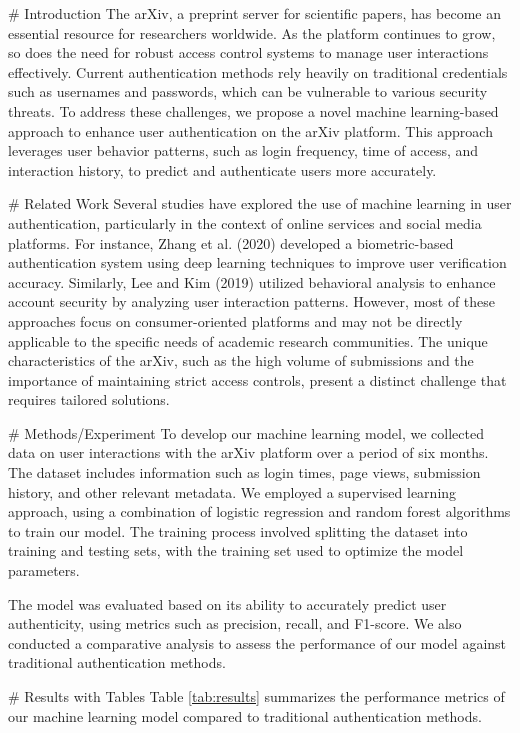 # Introduction
The arXiv, a preprint server for scientific papers, has become an essential resource for researchers worldwide. As the platform continues to grow, so does the need for robust access control systems to manage user interactions effectively. Current authentication methods rely heavily on traditional credentials such as usernames and passwords, which can be vulnerable to various security threats. To address these challenges, we propose a novel machine learning-based approach to enhance user authentication on the arXiv platform. This approach leverages user behavior patterns, such as login frequency, time of access, and interaction history, to predict and authenticate users more accurately.

# Related Work
Several studies have explored the use of machine learning in user authentication, particularly in the context of online services and social media platforms. For instance, Zhang et al. (2020) developed a biometric-based authentication system using deep learning techniques to improve user verification accuracy. Similarly, Lee and Kim (2019) utilized behavioral analysis to enhance account security by analyzing user interaction patterns. However, most of these approaches focus on consumer-oriented platforms and may not be directly applicable to the specific needs of academic research communities. The unique characteristics of the arXiv, such as the high volume of submissions and the importance of maintaining strict access controls, present a distinct challenge that requires tailored solutions.

# Methods/Experiment
To develop our machine learning model, we collected data on user interactions with the arXiv platform over a period of six months. The dataset includes information such as login times, page views, submission history, and other relevant metadata. We employed a supervised learning approach, using a combination of logistic regression and random forest algorithms to train our model. The training process involved splitting the dataset into training and testing sets, with the training set used to optimize the model parameters.

The model was evaluated based on its ability to accurately predict user authenticity, using metrics such as precision, recall, and F1-score. We also conducted a comparative analysis to assess the performance of our model against traditional authentication methods.

# Results with Tables
Table \ref{tab:results} summarizes the performance metrics of our machine learning model compared to traditional authentication methods.

